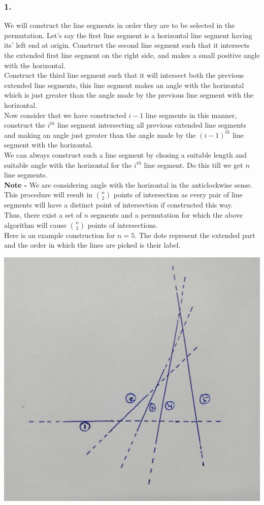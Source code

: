\documentclass[a4paper]{article}
\begin{document}
\subsubsection*{1.}
We will construct the line segments in order they are to be selected in the permutation. Let's say the first line segment is a horizontal line segment having its' left end at origin. Construct the second line segment such that it intersects the extended first line segment on the right side, and makes a small positive angle with the horizontal. \\
Construct the third line segment such that it will intersect both the previous extended line segments, this line segment makes an angle with the horizontal which is just greater than the angle made by the previous line segment with the horizontal.\\
Now consider that we have constructed $i-1$ line segments in this manner, construct the $i^{th}$ line segment intersecting all previous extended line segments and making an angle just greater than the angle made by the ${(i-1)}^{th}$ line segment with the horizontal. \\
We can always construct such a line segment by chosing a suitable length and suitable angle with the horizontal for the $i^{th}$ line segment. Do this till we get $n$ line segments.\\
\textbf{Note - }We are considering angle with the horizontal in the anticlockwise sense.\\
This procedure will result in $n\choose2$ points of intersection as every pair of line segments will have a distinct point of intersection if constructed this way.\\
Thus, there exist a set of $n$ segments and a permutation for which the above algorithm will cause $n\choose2$ points of intersections.\\
Here is an example construction for $n=5$. The dots represent the extended part and the order in which the lines are picked is their label.\\
\begin{center}
\includegraphics[scale=0.127]{IMG.jpg}
\end{center}
\end{document}
